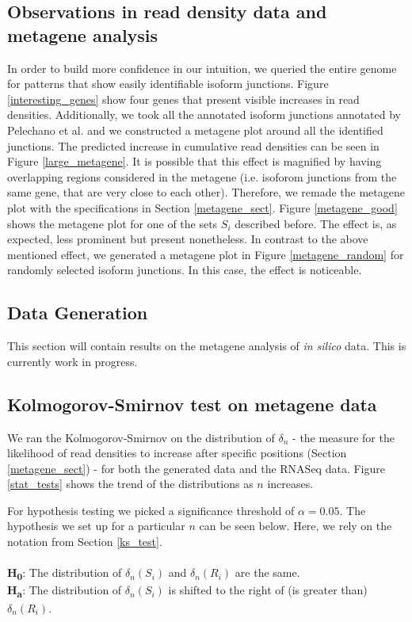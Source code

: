 \documentclass[12pt]{article}
\begin{document}
\subsection{Observations in read density data and metagene analysis}
In order to build more confidence in our intuition, we queried the entire genome for patterns that show easily identifiable isoform junctions. Figure \ref{interesting_genes} show four genes that present visible increases in read densities. 
Additionally, we took all the annotated isoform junctions annotated by Pelechano et al. \cite{Pelechano2013} and we constructed a metagene plot around all the identified junctions. The predicted increase in cumulative read densities can be seen in Figure \ref{large_metagene}. 
It is possible that this effect is magnified by having overlapping regions considered in the metagene (i.e. isoforom junctions from the same gene, that are very close to each other). Therefore, we remade the metagene plot with the specifications in Section \ref{metagene_sect}. Figure \ref{metagene_good} shows the metagene plot for one of the sets $S_i$ described before. The effect is, as expected, less prominent but present nonetheless. 
In contrast to the above mentioned effect, we generated a metagene plot in Figure \ref{metagene_random} for randomly selected isoform junctions. In this case, the effect is noticeable. 


\subsection{Data Generation}
This section will contain results on the metagene analysis of \textit{in silico} data. This is currently work in progress.

\subsection{Kolmogorov-Smirnov test on metagene data}

We ran the Kolmogorov-Smirnov on the distribution of $\delta_n$ - the measure for the likelihood of read densities to increase after specific positions (Section \ref{metagene_sect}) - for both the generated data and the RNASeq data. Figure \ref{stat_tests} shows the trend of the distributions as $n$ increases. 

For hypothesis testing we picked a significance threshold of $\alpha = 0.05$. The hypothesis we set up for a particular $n$ can be seen below. Here, we rely on the notation from Section \ref{ks_test}. \\
\\
\textbf{H\textsubscript{0}}: The distribution of $\delta_n(S_i)$ and $\delta_n(R_i)$ are the same. \\ 
\textbf{H\textsubscript{a}}: The distribution of $\delta_n(S_i)$ is shifted to the right of (is greater than) $\delta_n(R_i)$.\\
\end{document}
